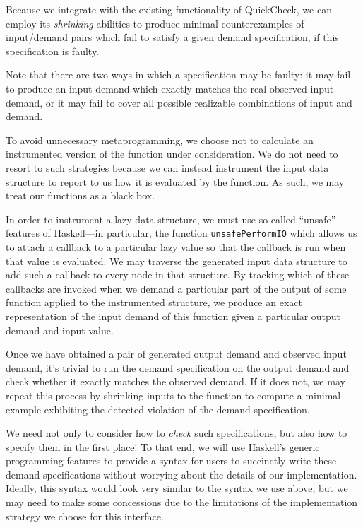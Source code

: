 \documentclass{article}
\begin{document}
Because we integrate with the existing functionality of QuickCheck, we
can employ its \emph{shrinking} abilities to produce minimal
counterexamples of input/demand pairs which fail to satisfy a given
demand specification, if this specification is faulty.

Note that there are two ways in which a specification may be faulty:
it may fail to produce an input demand which exactly matches the real
observed input demand, or it may fail to cover all possible realizable
combinations of input and demand.

To avoid unnecessary metaprogramming, we choose not to calculate an
instrumented version of the function under consideration. We do not
need to resort to such strategies because we can instead instrument
the input data structure to report to us how it is evaluated by the
function. As such, we may treat our functions as a black box.

In order to instrument a lazy data structure, we must use so-called
``unsafe'' features of Haskell---in particular, the function
\verb|unsafePerformIO| which allows us to attach a callback to a particular
lazy value so that the callback is run when that value is
evaluated. We may traverse the generated input data structure to add
such a callback to every node in that structure. By tracking which of
these callbacks are invoked when we demand a particular part of the
output of some function applied to the instrumented structure, we
produce an exact representation of the input demand of this function
given a particular output demand and input value.

Once we have obtained a pair of generated output demand and observed
input demand, it's trivial to run the demand specification on the
output demand and check whether it exactly matches the observed
demand. If it does not, we may repeat this process by shrinking inputs
to the function to compute a minimal example exhibiting the detected
violation of the demand specification.

We need not only to consider how to \emph{check} such specifications,
but also how to specify them in the first place! To that end, we will
use Haskell's generic programming features to provide a syntax for
users to succinctly write these demand specifications without worrying
about the details of our implementation. Ideally, this syntax would
look very similar to the syntax we use above, but we may need to make
some concessions due to the limitations of the implementation strategy
we choose for this interface.
\end{document}
